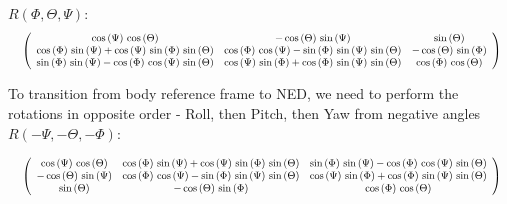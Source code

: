 $R(\Phi, \Theta, \Psi):$
\newline
\newline
\begin{displaymath}
\resizebox{1.0\textwidth}{!}{
$\left(\begin{array}{ccc}
\cos \left(\Psi \right)\,\cos \left(\Theta \right) & -\cos \left(\Theta \right)\,\sin \left(\Psi \right) & \sin \left(\Theta \right)\\
\cos \left(\Phi \right)\,\sin \left(\Psi \right)+\cos \left(\Psi \right)\,\sin \left(\Phi \right)\,\sin \left(\Theta \right) & \cos \left(\Phi \right)\,\cos \left(\Psi \right)-\sin \left(\Phi \right)\,\sin \left(\Psi \right)\,\sin \left(\Theta \right) & -\cos \left(\Theta \right)\,\sin \left(\Phi \right)\\
\sin \left(\Phi \right)\,\sin \left(\Psi \right)-\cos \left(\Phi \right)\,\cos \left(\Psi \right)\,\sin \left(\Theta \right) & \cos \left(\Psi \right)\,\sin \left(\Phi \right)+\cos \left(\Phi \right)\,\sin \left(\Psi \right)\,\sin \left(\Theta \right) & \cos \left(\Phi \right)\,\cos \left(\Theta \right)
\end{array}\right)$}
\end{displaymath}

To transition from body reference frame to NED, we need to perform the rotations in opposite order - Roll, then Pitch, then Yaw from negative angles
 $R( -\Psi, -\Theta ,-\Phi):$ 

\begin{displaymath}
\resizebox{1.0\textwidth}{!}{
$\left(\begin{array}{ccc}
\cos \left(\Psi \right)\,\cos \left(\Theta \right) & \cos \left(\Phi \right)\,\sin \left(\Psi \right)+\cos \left(\Psi \right)\,\sin \left(\Phi \right)\,\sin \left(\Theta \right) & \sin \left(\Phi \right)\,\sin \left(\Psi \right)-\cos \left(\Phi \right)\,\cos \left(\Psi \right)\,\sin \left(\Theta \right)\\
-\cos \left(\Theta \right)\,\sin \left(\Psi \right) & \cos \left(\Phi \right)\,\cos \left(\Psi \right)-\sin \left(\Phi \right)\,\sin \left(\Psi \right)\,\sin \left(\Theta \right) & \cos \left(\Psi \right)\,\sin \left(\Phi \right)+\cos \left(\Phi \right)\,\sin \left(\Psi \right)\,\sin \left(\Theta \right)\\
\sin \left(\Theta \right) & -\cos \left(\Theta \right)\,\sin \left(\Phi \right) & \cos \left(\Phi \right)\,\cos \left(\Theta \right)
\end{array}\right)$}
\end{displaymath}

